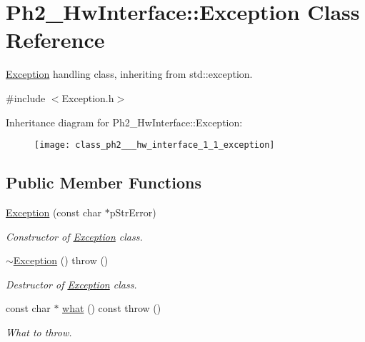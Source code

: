 \hypertarget{class_ph2___hw_interface_1_1_exception}{\section{Ph2\-\_\-\-Hw\-Interface\-:\-:Exception Class Reference}
\label{class_ph2___hw_interface_1_1_exception}
}


\hyperlink{class_ph2___hw_interface_1_1_exception}{Exception} handling class, inheriting from std\-::exception.  




{\ttfamily \#include $<$Exception.\-h$>$}

Inheritance diagram for Ph2\-\_\-\-Hw\-Interface\-:\-:Exception\-:\begin{figure}[H]
\begin{center}
\leavevmode
\texttt{[image: class\_ph2\_\_\_hw\_interface\_1\_1\_exception]}
\end{center}
\end{figure}
\subsection*{Public Member Functions}
\begin{DoxyCompactItemize}
\item 
\hyperlink{class_ph2___hw_interface_1_1_exception_a9ac7df51fe36dfb65ff24ca975ec846f}{Exception} (const char $\ast$p\-Str\-Error)
\begin{DoxyCompactList}\small\item\em Constructor of \hyperlink{class_ph2___hw_interface_1_1_exception}{Exception} class. \end{DoxyCompactList}\item 
\hyperlink{class_ph2___hw_interface_1_1_exception_a667217cdbe920cb69842a3d3afb69d35}{$\sim$\-Exception} ()  throw ()
\begin{DoxyCompactList}\small\item\em Destructor of \hyperlink{class_ph2___hw_interface_1_1_exception}{Exception} class. \end{DoxyCompactList}\item 
const char $\ast$ \hyperlink{class_ph2___hw_interface_1_1_exception_a8db77fef785111589956a21598b748e0}{what} () const   throw ()
\begin{DoxyCompactList}\small\item\em What to throw. \end{DoxyCompactList}\end{DoxyCompactItemize}
